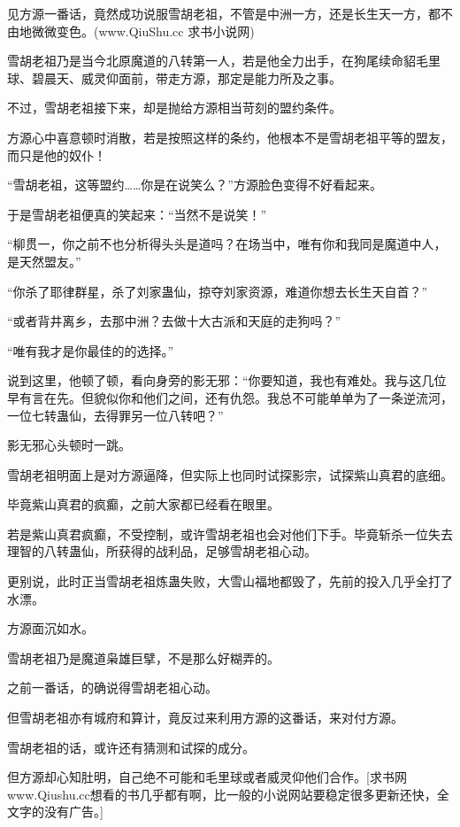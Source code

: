 
\begin{this_body}

见方源一番话，竟然成功说服雪胡老祖，不管是中洲一方，还是长生天一方，都不由地微微变色。(www.QiuShu.cc 求书小说网)

雪胡老祖乃是当今北原魔道的八转第一人，若是他全力出手，在狗尾续命貂毛里球、碧晨天、威灵仰面前，带走方源，那定是能力所及之事。

不过，雪胡老祖接下来，却是抛给方源相当苛刻的盟约条件。

方源心中喜意顿时消散，若是按照这样的条约，他根本不是雪胡老祖平等的盟友，而只是他的奴仆！

“雪胡老祖，这等盟约……你是在说笑么？”方源脸色变得不好看起来。

于是雪胡老祖便真的笑起来：“当然不是说笑！”

“柳贯一，你之前不也分析得头头是道吗？在场当中，唯有你和我同是魔道中人，是天然盟友。”

“你杀了耶律群星，杀了刘家蛊仙，掠夺刘家资源，难道你想去长生天自首？”

“或者背井离乡，去那中洲？去做十大古派和天庭的走狗吗？”

“唯有我才是你最佳的的选择。”

说到这里，他顿了顿，看向身旁的影无邪：“你要知道，我也有难处。我与这几位早有言在先。但貌似你和他们之间，还有仇怨。我总不可能单单为了一条逆流河，一位七转蛊仙，去得罪另一位八转吧？”

影无邪心头顿时一跳。

雪胡老祖明面上是对方源逼降，但实际上也同时试探影宗，试探紫山真君的底细。

毕竟紫山真君的疯癫，之前大家都已经看在眼里。

若是紫山真君疯癫，不受控制，或许雪胡老祖也会对他们下手。毕竟斩杀一位失去理智的八转蛊仙，所获得的战利品，足够雪胡老祖心动。

更别说，此时正当雪胡老祖炼蛊失败，大雪山福地都毁了，先前的投入几乎全打了水漂。

方源面沉如水。

雪胡老祖乃是魔道枭雄巨擘，不是那么好糊弄的。

之前一番话，的确说得雪胡老祖心动。

但雪胡老祖亦有城府和算计，竟反过来利用方源的这番话，来对付方源。

雪胡老祖的话，或许还有猜测和试探的成分。

但方源却心知肚明，自己绝不可能和毛里球或者威灵仰他们合作。[求书网www.Qiushu.cc想看的书几乎都有啊，比一般的小说网站要稳定很多更新还快，全文字的没有广告。]


\end{this_body}
